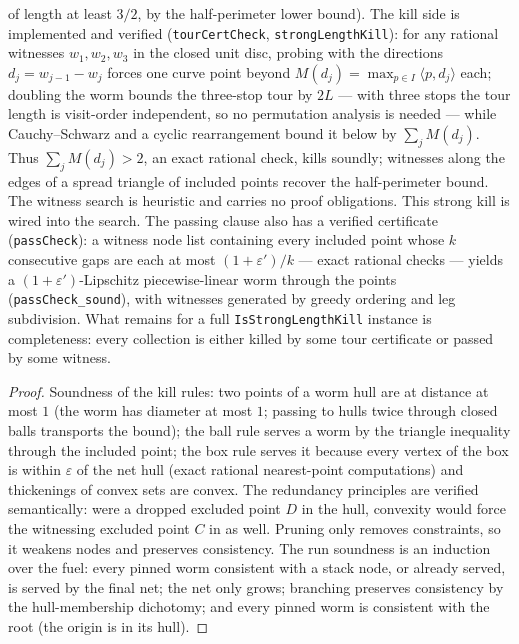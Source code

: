 \begin{theorem}
    of length at least $3/2$, by the half-perimeter lower bound). The kill
    side is implemented and verified (\texttt{tourCertCheck},
    \texttt{strongLengthKill}): for any rational witnesses
    $w_1, w_2, w_3$ in the closed unit disc, probing with the directions
    $d_j = w_{j-1} - w_j$ forces one curve point beyond
    $M(d_j) = \max_{p \in I} \langle p, d_j\rangle$ each; doubling the
    worm bounds the three-stop tour by $2L$ — with three stops the tour
    length is visit-order independent, so no permutation analysis is needed
    — while Cauchy--Schwarz and a cyclic rearrangement bound it below by
    $\sum_j M(d_j)$. Thus $\sum_j M(d_j) > 2$, an exact rational check,
    kills soundly; witnesses along the edges of a spread triangle of
    included points recover the half-perimeter bound. The witness search is
    heuristic and carries no proof obligations. This strong kill is wired
    into the search. The passing clause also has a verified certificate
    (\texttt{passCheck}): a witness node list containing every included
    point whose $k$ consecutive gaps are each at most
    $(1+\varepsilon')/k$ — exact rational checks — yields a
    $(1+\varepsilon')$-Lipschitz piecewise-linear worm through the points
    (\texttt{passCheck\_sound}), with witnesses generated by greedy
    ordering and leg subdivision. What remains for a full
    \texttt{IsStrongLengthKill} instance is completeness: every collection
    is either killed by some tour certificate or passed by some witness.
\end{theorem}
\begin{proof}
    Soundness of the kill rules: two points of a worm hull are at distance
    at most $1$ (the worm has diameter at most $1$; passing to hulls twice
    through closed balls transports the bound); the ball rule serves a worm
    by the triangle inequality through the included point; the box rule
    serves it because every vertex of the box is within $\varepsilon$ of the
    net hull (exact rational nearest-point computations) and thickenings of
    convex sets are convex. The redundancy principles are verified
    semantically: were a dropped excluded point $D$ in the hull, convexity
    would force the witnessing excluded point $C$ in as well. Pruning only
    removes constraints, so it weakens nodes and preserves consistency. The
    run soundness is an induction over the fuel: every pinned worm
    consistent with a stack node, or already served, is served by the final
    net; the net only grows; branching preserves consistency by the
    hull-membership dichotomy; and every pinned worm is consistent with the
    root (the origin is in its hull).
\end{proof}

